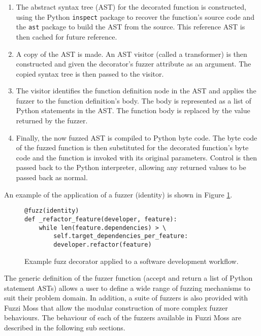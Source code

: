 \documentclass{sig-alternate}
\begin{document}
\begin{enumerate}

\item The abstract syntax tree (AST) for the decorated function is constructed,
  using the Python \lstinline!inspect! package to recover the function's source
  code and the \lstinline!ast!  package to build the AST from the source.  This
  reference AST is then cached for future reference.

\item A copy of the AST is made.  An AST visitor (called a transformer) is then
  constructed and given the decorator's fuzzer attribute as an argument.  The
  copied syntax tree is then passed to the visitor.

\item The visitor identifies the function definition node in the AST and applies
  the fuzzer to the function definition's body.  The body is represented as a
  list of Python statements in the AST.  The function body is replaced by the
  value returned by the fuzzer.

\item Finally, the now fuzzed AST is compiled to Python byte code.  The byte
  code of the fuzzed function is then substituted for the decorated function's
  byte code and the function is invoked with its original parameters.  Control
  is then passed back to the Python interpreter, allowing any returned values to
  be passed back as normal.

\end{enumerate}

An example of the application of a fuzzer (identity) is shown in Figure
\ref{fig:fuzz}.

 \begin{figure}
   \centering
  \begin{lstlisting}
@fuzz(identity)
def _refactor_feature(developer, feature):
    while len(feature.dependencies) > \
        self.target_dependencies_per_feature:
        developer.refactor(feature)
  \end{lstlisting}
  
  \caption{Example fuzz decorator applied to a software development workflow.}
  \label{fig:fuzz}
\end{figure}

The generic definition of the fuzzer function (accept and return a list of
Python statement ASTs) allows a user to define a wide range of fuzzing
mechanisms to suit their problem domain.  In addition, a suite of fuzzers is
also provided with Fuzzi Moss that allow the modular construction of more
complex fuzzer behaviours.  The behaviour of each of the fuzzers available in
Fuzzi Moss are described in the following sub sections.
\end{document}
